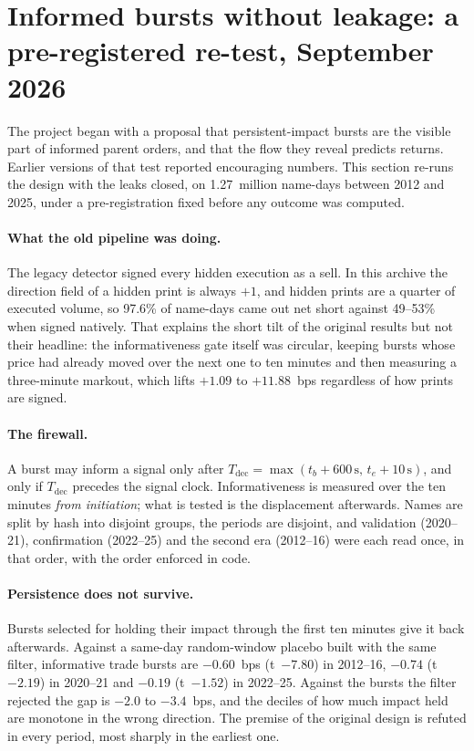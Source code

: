 \documentclass[11pt]{article}
\begin{document}
\section{Informed bursts without leakage: a pre-registered re-test, September 2026}
\label{sec:p4revisit2026}

The project began with a proposal that persistent-impact bursts are the visible part of informed
parent orders, and that the flow they reveal predicts returns. Earlier versions of that test
reported encouraging numbers. This section re-runs the design with the leaks closed, on
1.27~million name-days between 2012 and 2025, under a pre-registration fixed before any outcome was
computed.

\paragraph{What the old pipeline was doing.} The legacy detector signed every hidden execution as a
sell. In this archive the direction field of a hidden print is always $+1$, and hidden prints are a
quarter of executed volume, so 97.6\% of name-days came out net short against 49--53\% when signed
natively. That explains the short tilt of the original results but not their headline: the
informativeness gate itself was circular, keeping bursts whose price had already moved over the
next one to ten minutes and then measuring a three-minute markout, which lifts $+1.09$ to
$+11.88$~bps regardless of how prints are signed.

\paragraph{The firewall.} A burst may inform a signal only after
$T_{\mathrm{dec}}=\max(t_b+600\,\mathrm{s},\,t_e+10\,\mathrm{s})$, and only if $T_{\mathrm{dec}}$
precedes the signal clock. Informativeness is measured over the ten minutes \emph{from initiation};
what is tested is the displacement afterwards. Names are split by hash into disjoint groups, the
periods are disjoint, and validation (2020--21), confirmation (2022--25) and the second era
(2012--16) were each read once, in that order, with the order enforced in code.

\paragraph{Persistence does not survive.} Bursts selected for holding their impact through the
first ten minutes give it back afterwards. Against a same-day random-window placebo built with the
same filter, informative trade bursts are $-0.60$~bps (t~$-7.80$) in 2012--16, $-0.74$ (t~$-2.19$)
in 2020--21 and $-0.19$ (t~$-1.52$) in 2022--25. Against the bursts the filter rejected the gap is
$-2.0$ to $-3.4$~bps, and the deciles of how much impact held are monotone in the wrong direction.
The premise of the original design is refuted in every period, most sharply in the earliest one.
\end{document}
